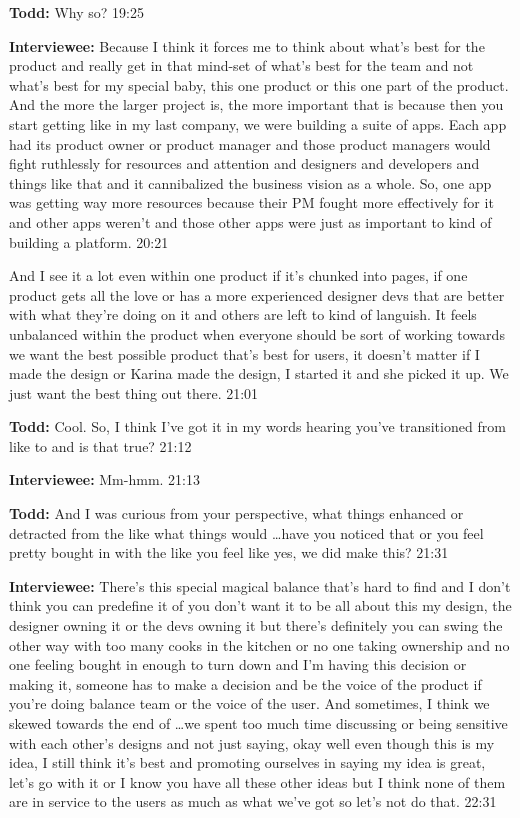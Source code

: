 \textbf{Todd:} Why so?  19:25

\textbf{Interviewee:} Because I think it forces me to think about what's best for the product and really get in that mind-set of what's best for the team and not what's best for my special baby, this one product or this one part of the product.  And the more the larger project is, the more important that is because then you start getting like in my last company, we were building a suite of apps.  Each app had its product owner or product manager and those product managers would fight ruthlessly for resources and attention and designers and developers and things like that and it cannibalized the business vision as a whole.  So, one app was getting way more resources because their PM fought more effectively for it and other apps weren't and those other apps were just as important to kind of building a platform.  20:21

And I see it a lot even within one product if it's chunked into pages, if one product gets all the love or has a more experienced designer devs that are better with what they're doing on it and others are left to kind of languish.  It feels unbalanced within the product when everyone should be sort of working towards we want the best possible product that's best for users, it doesn't matter if I made the design or Karina made the design, I started it and she picked it up.  We just want the best thing out there.  21:01

\textbf{Todd:} Cool.  So, I think I've got it in my words hearing you've transitioned from like  to  and is that true?  21:12

\textbf{Interviewee:} Mm-hmm.  21:13

\textbf{Todd:} And I was curious from your perspective, what things enhanced or detracted from the  like what things would \ldots have you noticed that or you feel pretty bought in with the  like you feel like yes, we did make this?  21:31

\textbf{Interviewee:} There's this special magical balance that's hard to find and I don't think you can predefine it of you don't want it to be all about this my design, the designer owning it or the devs owning it but there's definitely you can swing the other way with too many cooks in the kitchen or no one taking ownership and no one feeling bought in enough to turn down and I'm having this decision or making it, someone has to make a decision and be the voice of the product if you're doing balance team or the voice of the user. And sometimes, I think we skewed towards the end of \ldots we spent too much time discussing or being sensitive with each other's designs and not just saying, okay well even though this is my idea, I still think it's best and promoting ourselves in saying my idea is great, let's go with it or I know you have all these other ideas but I think none of them are in service to the users as much as what we've got so let's not do that.  22:31

